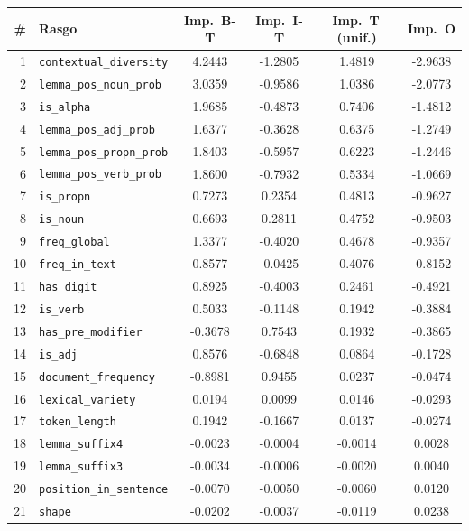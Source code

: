 \begin{table}[ht]
\centering
\small
\begin{tabular}{@{} r l c c c c @{}}
\toprule
\# & \textbf{Rasgo} & \textbf{Imp.\ B-T} & \textbf{Imp.\ I-T} & \textbf{Imp.\ T\,(unif.)} & \textbf{Imp.\ O} \\
\midrule
1 & \texttt{contextual\_diversity} & 4.2443 & -1.2805 & 1.4819 & -2.9638 \\
2 & \texttt{lemma\_pos\_noun\_prob} & 3.0359 & -0.9586 & 1.0386 & -2.0773 \\
3 & \texttt{is\_alpha} & 1.9685 & -0.4873 & 0.7406 & -1.4812 \\
4 & \texttt{lemma\_pos\_adj\_prob} & 1.6377 & -0.3628 & 0.6375 & -1.2749 \\
5 & \texttt{lemma\_pos\_propn\_prob} & 1.8403 & -0.5957 & 0.6223 & -1.2446 \\
6 & \texttt{lemma\_pos\_verb\_prob} & 1.8600 & -0.7932 & 0.5334 & -1.0669 \\
7 & \texttt{is\_propn} & 0.7273 & 0.2354 & 0.4813 & -0.9627 \\
8 & \texttt{is\_noun} & 0.6693 & 0.2811 & 0.4752 & -0.9503 \\
9 & \texttt{freq\_global} & 1.3377 & -0.4020 & 0.4678 & -0.9357 \\
10 & \texttt{freq\_in\_text} & 0.8577 & -0.0425 & 0.4076 & -0.8152 \\
11 & \texttt{has\_digit} & 0.8925 & -0.4003 & 0.2461 & -0.4921 \\
12 & \texttt{is\_verb} & 0.5033 & -0.1148 & 0.1942 & -0.3884 \\
13 & \texttt{has\_pre\_modifier} & -0.3678 & 0.7543 & 0.1932 & -0.3865 \\
14 & \texttt{is\_adj} & 0.8576 & -0.6848 & 0.0864 & -0.1728 \\
15 & \texttt{document\_frequency} & -0.8981 & 0.9455 & 0.0237 & -0.0474 \\
16 & \texttt{lexical\_variety} & 0.0194 & 0.0099 & 0.0146 & -0.0293 \\
17 & \texttt{token\_length} & 0.1942 & -0.1667 & 0.0137 & -0.0274 \\
18 & \texttt{lemma\_suffix4} & -0.0023 & -0.0004 & -0.0014 & 0.0028 \\
19 & \texttt{lemma\_suffix3} & -0.0034 & -0.0006 & -0.0020 & 0.0040 \\
20 & \texttt{position\_in\_sentence} & -0.0070 & -0.0050 & -0.0060 & 0.0120 \\
21 & \texttt{shape} & -0.0202 & -0.0037 & -0.0119 & 0.0238 \\

\end{tabular}
\end{table}

